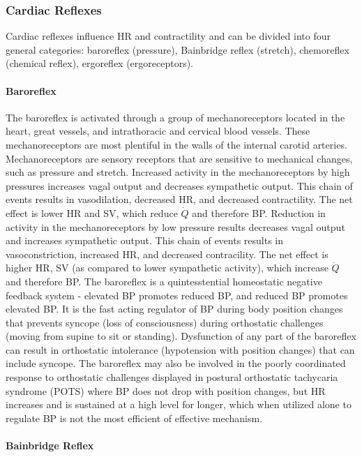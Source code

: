 \subsubsection{Cardiac Reflexes}
Cardiac reflexes influence HR and contractility and can be divided into four general categories: baroreflex (pressure), Bainbridge reflex (stretch), chemoreflex (chemical reflex), ergoreflex (ergoreceptors). 

\paragraph{Baroreflex}

The baroreflex is activated through a group of mechanoreceptors located in the heart, great vessels, and intrathoracic and cervical blood vessels. These mechanoreceptors are most plentiful in the walls of the internal carotid arteries. Mechanoreceptors are sensory receptors that are sensitive to mechanical changes, such as pressure and stretch. Increased activity in the mechanoreceptors by high pressures increases vagal output and decreases sympathetic output. This chain of events results in vasodilation, decreased HR, and decreased contractility. The net effect is lower HR and SV, which reduce $\dot{Q}$ and therefore BP. Reduction in activity in the mechanoreceptors by low pressure results decreases vagal output and increases sympathetic output. This chain of events results in vasoconstriction, increased HR, and decreased contracility. The net effect is higher HR,  SV (as compared to lower sympathetic activity), which increase $\dot{Q}$ and therefore BP. The baroreflex is a quintesstential homeostatic negative feedback system - elevated BP promotes reduced BP, and reduced BP promotes elevated BP. It is the fast acting regulator of BP during body position changes that prevents syncope (loss of consciousness) during orthostatic challenges  (moving from supine to sit or standing).
Dysfunction of any part of the baroreflex can result in orthostatic intolerance (hypotension with position changes) that can include syncope. The baroreflex may also be involved in the poorly coordinated response to orthostatic challenges displayed in postural orthostatic tachycaria syndrome (POTS) where BP does not drop with position changes, but HR increases and is sustained at a high level for longer, which when utilized alone to regulate BP is not the most efficient of effective mechanism.  



\paragraph{Bainbridge Reflex}

